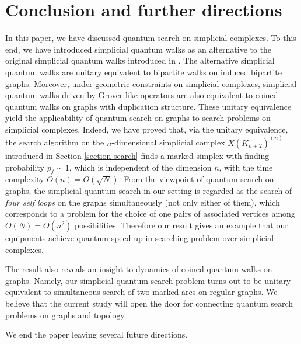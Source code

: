 \documentclass[a4paper,12pt]{article}
\numberwithin{equation}{section}
\begin{document}
\section{Conclusion and further directions}
In this paper, we have discussed quantum search on simplicial complexes.
To this end, we have introduced simplicial quantum walks as an alternative to the original simplicial quantum walks introduced in \cite{MOSver1}.
The alternative simplicial quantum walks are unitary equivalent to bipartite walks on induced bipartite graphs.
Moreover, under geometric constraints on simplicial complexes, simplicial quantum walks driven by Grover-like operators are also equivalent to coined quantum walks on graphs with duplication structure.
These unitary equivalence yield the applicability of quantum search on graphs to search problems on simplicial complexes.
Indeed, we have proved that, via the unitary equivalence, the search algorithm on the $n$-dimensional simplicial complex $X(K_{n+2})^{(n)}$ introduced in Section \ref{section-search} finds a marked simplex with finding probability $p_f\sim 1$, which is independent of the dimension $n$, with the time complexity $O(n)=O(\sqrt{N})$. 
From the viewpoint of quantum search on graphs, the simplicial quantum search in our setting is regarded as the search of {\em four self loops} on the graphs simultaneously (not only either of them), which corresponds to a problem for the choice of one pairs of associated vertices among $O(N) = O(n^2)$ possibilities. 
Therefore our result gives an example that our equipments achieve quantum speed-up in searching problem over simplicial complexes.
\par
The result also reveals an insight to dynamics of coined quantum walks on graphs.
Namely, our simplicial quantum search problem turns out to be unitary equivalent to simultaneous search of two marked arcs on regular graphs.
We believe that the current study will open the door for connecting quantum search problems on graphs and topology.
\par
We end the paper leaving several future directions.
\end{document}
